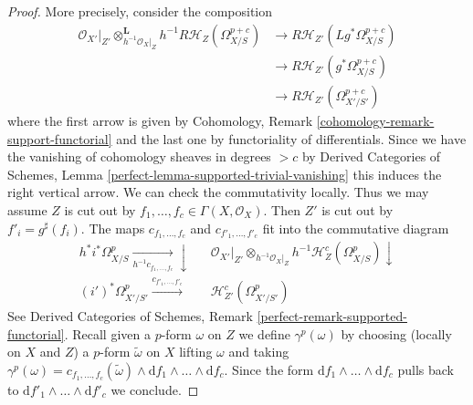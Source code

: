\begin{proof}
More precisely, consider the composition
\begin{align*}
\mathcal{O}_{X'}|_{Z'} \otimes_{h^{-1}\mathcal{O}_X|_Z}^\mathbf{L}
h^{-1}R\mathcal{H}_Z(\Omega^{p + c}_{X/S})
& \to
R\mathcal{H}_{Z'}(Lg^*\Omega^{p + c}_{X/S}) \\
& \to
R\mathcal{H}_{Z'}(g^*\Omega^{p + c}_{X/S}) \\
& \to
R\mathcal{H}_{Z'}(\Omega^{p + c}_{X'/S'})
\end{align*}
where the first arrow is given by
Cohomology, Remark \ref{cohomology-remark-support-functorial}
and the last one by functoriality of differentials.
Since we have the vanishing of cohomology sheaves in degrees $> c$
by Derived Categories of Schemes, Lemma
\ref{perfect-lemma-supported-trivial-vanishing}
this induces the right vertical arrow.
We can check the commutativity locally.
Thus we may assume $Z$ is cut out by
$f_1, \ldots, f_c \in \Gamma(X, \mathcal{O}_X)$.
Then $Z'$ is cut out by $f'_i = g^\sharp(f_i)$.
The maps $c_{f_1, \ldots, f_c}$ and $c_{f'_1, \ldots, f'_c}$
fit into the commutative diagram
$$
\begin{array}{ccc}h^*i^*\Omega^p_{X/S} \underset{h^{-1}c_{f_1, \ldots, f_c}}{\longrightarrow}\downarrow &  & \mathcal{O}_{X'}|_{Z'} \otimes_{h^{-1}\mathcal{O}_X|_Z}
h^{-1}\mathcal{H}^c_Z(\Omega^p_{X/S}) \downarrow \\ (i')^*\Omega^p_{X'/S'} \overset{c_{f'_1, \ldots, f'_c}}{\longrightarrow} &  & \mathcal{H}^c_{Z'}(\Omega^p_{X'/S'})\end{array}
$$
See Derived Categories of Schemes, Remark
\ref{perfect-remark-supported-functorial}.
Recall given a $p$-form $\omega$ on $Z$ we define
$\gamma^p(\omega)$ by choosing (locally on $X$ and $Z$)
a $p$-form $\tilde \omega$ on $X$ lifting $\omega$ and taking
$\gamma^p(\omega) =
c_{f_1, \ldots, f_c}(\tilde \omega) \wedge
\text{d}f_1 \wedge \ldots \wedge \text{d}f_c$.
Since the form $\text{d}f_1 \wedge \ldots \wedge \text{d}f_c$
pulls back to
$\text{d}f'_1 \wedge \ldots \wedge \text{d}f'_c$ we conclude.
\end{proof}

